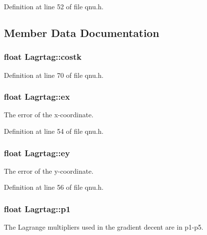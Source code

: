 Definition at line 52 of file qnu.\-h.



\subsection{Member Data Documentation}
\hypertarget{struct_lagrtag_ac8d1c29a3fb78cfcced735edca0b19f6}{
\subsubsection[{costk}]{\setlength{\rightskip}{0pt plus 5cm}float Lagrtag\-::costk}}\label{struct_lagrtag_ac8d1c29a3fb78cfcced735edca0b19f6}


Definition at line 70 of file qnu.\-h.

\hypertarget{struct_lagrtag_a484c424884aba9f6449f4f6820c24376}{
\subsubsection[{ex}]{\setlength{\rightskip}{0pt plus 5cm}float Lagrtag\-::ex}}\label{struct_lagrtag_a484c424884aba9f6449f4f6820c24376}


The error of the x-\/coordinate. 



Definition at line 54 of file qnu.\-h.

\hypertarget{struct_lagrtag_a5d794c31a0f46fc41ba38399549d29aa}{
\subsubsection[{ey}]{\setlength{\rightskip}{0pt plus 5cm}float Lagrtag\-::ey}}\label{struct_lagrtag_a5d794c31a0f46fc41ba38399549d29aa}


The error of the y-\/coordinate. 



Definition at line 56 of file qnu.\-h.

\hypertarget{struct_lagrtag_a389791d847985147ab3053236ef0fa8d}{
\subsubsection[{p1}]{\setlength{\rightskip}{0pt plus 5cm}float Lagrtag\-::p1}}\label{struct_lagrtag_a389791d847985147ab3053236ef0fa8d}
The Lagrange multipliers used in the gradient decent are in p1-\/p5. 

